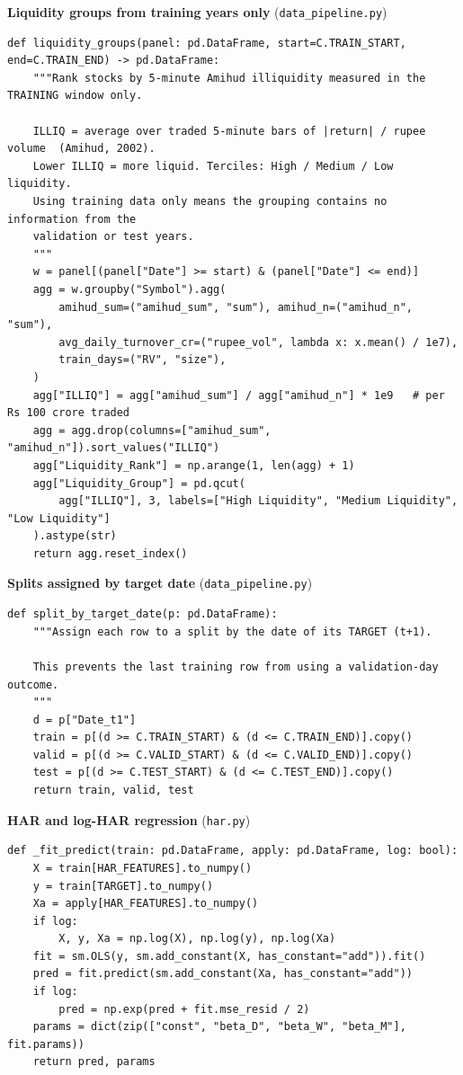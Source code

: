 \documentclass[11pt,a4paper]{article}
\begin{document}
\textbf{Liquidity groups from training years only} (\texttt{data\_pipeline.py})
\begin{lstlisting}
def liquidity_groups(panel: pd.DataFrame, start=C.TRAIN_START, end=C.TRAIN_END) -> pd.DataFrame:
    """Rank stocks by 5-minute Amihud illiquidity measured in the TRAINING window only.

    ILLIQ = average over traded 5-minute bars of |return| / rupee volume  (Amihud, 2002).
    Lower ILLIQ = more liquid. Terciles: High / Medium / Low liquidity.
    Using training data only means the grouping contains no information from the
    validation or test years.
    """
    w = panel[(panel["Date"] >= start) & (panel["Date"] <= end)]
    agg = w.groupby("Symbol").agg(
        amihud_sum=("amihud_sum", "sum"), amihud_n=("amihud_n", "sum"),
        avg_daily_turnover_cr=("rupee_vol", lambda x: x.mean() / 1e7),
        train_days=("RV", "size"),
    )
    agg["ILLIQ"] = agg["amihud_sum"] / agg["amihud_n"] * 1e9   # per Rs 100 crore traded
    agg = agg.drop(columns=["amihud_sum", "amihud_n"]).sort_values("ILLIQ")
    agg["Liquidity_Rank"] = np.arange(1, len(agg) + 1)
    agg["Liquidity_Group"] = pd.qcut(
        agg["ILLIQ"], 3, labels=["High Liquidity", "Medium Liquidity", "Low Liquidity"]
    ).astype(str)
    return agg.reset_index()
\end{lstlisting}

\textbf{Splits assigned by target date} (\texttt{data\_pipeline.py})
\begin{lstlisting}
def split_by_target_date(p: pd.DataFrame):
    """Assign each row to a split by the date of its TARGET (t+1).

    This prevents the last training row from using a validation-day outcome.
    """
    d = p["Date_t1"]
    train = p[(d >= C.TRAIN_START) & (d <= C.TRAIN_END)].copy()
    valid = p[(d >= C.VALID_START) & (d <= C.VALID_END)].copy()
    test = p[(d >= C.TEST_START) & (d <= C.TEST_END)].copy()
    return train, valid, test
\end{lstlisting}

\textbf{HAR and log-HAR regression} (\texttt{har.py})
\begin{lstlisting}
def _fit_predict(train: pd.DataFrame, apply: pd.DataFrame, log: bool):
    X = train[HAR_FEATURES].to_numpy()
    y = train[TARGET].to_numpy()
    Xa = apply[HAR_FEATURES].to_numpy()
    if log:
        X, y, Xa = np.log(X), np.log(y), np.log(Xa)
    fit = sm.OLS(y, sm.add_constant(X, has_constant="add")).fit()
    pred = fit.predict(sm.add_constant(Xa, has_constant="add"))
    if log:
        pred = np.exp(pred + fit.mse_resid / 2)
    params = dict(zip(["const", "beta_D", "beta_W", "beta_M"], fit.params))
    return pred, params
\end{lstlisting}
\end{document}
